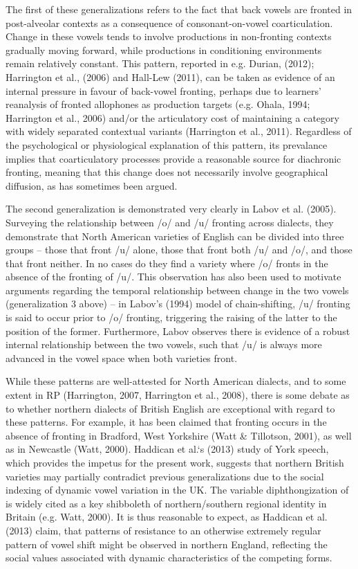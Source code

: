 \documentclass[12pt]{article}
\begin{document}
The first of these generalizations refers to the fact that back vowels are fronted in post-alveolar contexts as a consequence of consonant-on-vowel coarticulation. Change in these vowels tends to involve productions in non-fronting contexts gradually moving forward, while productions in conditioning environments remain relatively constant. This pattern, reported in e.g. Durian, (2012); Harrington et al., (2006) and Hall-Lew (2011), can be taken as evidence of an internal pressure in favour of back-vowel fronting, perhaps due to learners' reanalysis of fronted allophones as production targets (e.g. Ohala, 1994; Harrington et al., 2006) and/or the articulatory cost of maintaining a category with widely separated contextual variants (Harrington et al., 2011). Regardless of the psychological or physiological explanation of this pattern, its prevalance implies that coarticulatory processes provide a reasonable source for diachronic fronting, meaning that this change does not necessarily involve geographical diffusion, as has sometimes been argued.

The second generalization is demonstrated very clearly in Labov et al. (2005).   Surveying the relationship between /o/ and /u/ fronting across dialects, they demonstrate that North American varieties of English can be divided into three groups -- those that front /u/ alone, those that front both /u/ and /o/, and those that front neither. In no cases do they find a variety where /o/ fronts in the absence of the fronting of /u/. This observation has also been used to motivate arguments regarding the temporal relationship between change in the two vowels (generalization 3 above) -- in Labov's (1994) model of chain-shifting, /u/ fronting is said to occur prior to /o/ fronting, triggering the raising of the latter to the position of the former. Furthermore, Labov observes there is evidence of a robust internal relationship between the two vowels, such that /u/ is always more advanced in the vowel space when both varieties front. 

While these patterns are well-attested for North American dialects, and to some extent in RP (Harrington, 2007, Harrington et al., 2008), there is some debate as to whether northern dialects of British English are exceptional with regard to these patterns. For example, it has been claimed that  fronting occurs in the absence of  fronting in Bradford, West Yorkshire (Watt \& Tillotson, 2001), as well as in Newcastle (Watt, 2000). Haddican et al.`s (2013) study of York speech, which provides the impetus for the present work, suggests that northern British varieties may partially contradict previous generalizations due to the social indexing of dynamic vowel variation in the UK. The variable diphthongization of  is widely cited as a key shibboleth of northern/southern regional identity in Britain (e.g. Watt, 2000). It is thus reasonable to expect, as Haddican et al. (2013) claim, that patterns of resistance to an otherwise extremely regular pattern of vowel shift might be observed in northern England, reflecting the social values associated with dynamic characteristics of the competing forms.
\end{document}
